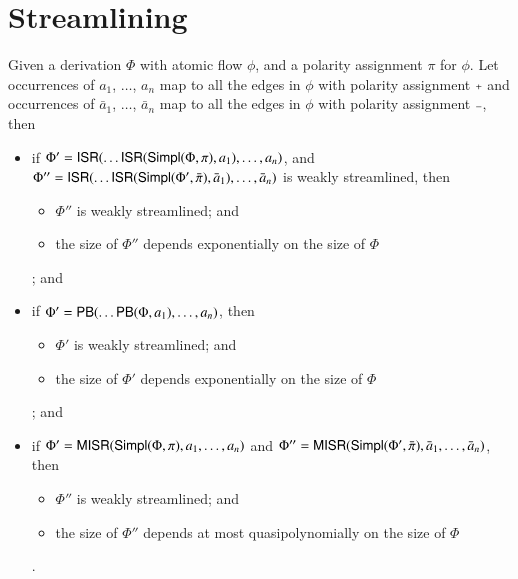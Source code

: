 \chapter{Streamlining}\label{chapter:Streamlining}

\begin{proposition}
Given a derivation $\Phi$ with atomic flow $\phi$, and a polarity assignment $\pi$ for $\phi$. Let occurrences of $a_1$, $\dots$, $a_n$ map to all the edges in $\phi$ with polarity assignment $\ppl$ and occurrences of $\bar a_1$, $\dots$, $\bar a_n$ map to all the edges in $\phi$ with polarity assignment $\pmi$, then
\begin{itemize}
\item if $\Phi'=\mathsf{ISR}(\dots\mathsf{ISR}(\mathsf{Simpl}(\Phi,\pi),a_1),\dots,a_n)$, and $\Phi''=\mathsf{ISR}(\dots\mathsf{ISR}(\mathsf{Simpl}(\Phi',\bar\pi),\bar a_1),\dots,\bar a_n)$ is weakly streamlined, then
\begin{itemize}
\item $\Phi''$ is weakly streamlined; and
\item the size of $\Phi''$ depends exponentially on the size of $\Phi$
\end{itemize}; and
\item if $\Phi'=\mathsf{PB}(\dots\mathsf{PB}(\Phi,a_1),\dots,a_n)$, then
\begin{itemize}
\item $\Phi'$ is weakly streamlined; and
\item the size of $\Phi'$ depends exponentially on the size of $\Phi$
\end{itemize}; and
\item if $\Phi'=\mathsf{MISR}(\mathsf{Simpl}(\Phi,\pi),a_1,\dots,a_n)$ and $\Phi''=\mathsf{MISR}(\mathsf{Simpl}(\Phi',\bar \pi),\bar a_1,\dots,\bar a_n)$, then
\begin{itemize}
\item $\Phi''$ is weakly streamlined; and
\item the size of $\Phi''$ depends at most quasipolynomially on the size of $\Phi$
\end{itemize}.
\end{itemize}
\end{proposition}